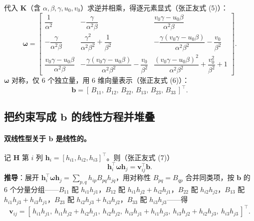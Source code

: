 代入 $\mathbf{K}$（含 $\alpha,\beta,\gamma,u_0,v_0$）求逆并相乘，得逐元素显式（张正友式 (5)\cite{zhang2000calibration}）：
\begin{equation}
  \boldsymbol{\omega}=\begin{bmatrix}
  \dfrac{1}{\alpha^2} & -\dfrac{\gamma}{\alpha^2\beta} & \dfrac{v_0\gamma-u_0\beta}{\alpha^2\beta}\\[2.2ex]
  -\dfrac{\gamma}{\alpha^2\beta} & \dfrac{\gamma^2}{\alpha^2\beta^2}+\dfrac{1}{\beta^2} & -\dfrac{\gamma(v_0\gamma-u_0\beta)}{\alpha^2\beta^2}-\dfrac{v_0}{\beta^2}\\[2.2ex]
  \dfrac{v_0\gamma-u_0\beta}{\alpha^2\beta} & -\dfrac{\gamma(v_0\gamma-u_0\beta)}{\alpha^2\beta^2}-\dfrac{v_0}{\beta^2} & \dfrac{(v_0\gamma-u_0\beta)^2}{\alpha^2\beta^2}+\dfrac{v_0^2}{\beta^2}+1
  \end{bmatrix}.
  \label{eq:calib-omega-elements}
\end{equation}
$\boldsymbol{\omega}$ 对称，仅 $6$ 个独立量，用 $6$ 维向量表示（张正友式 (6)\cite{zhang2000calibration}）：
\begin{equation}
  \mathbf{b}=[\,B_{11},\,B_{12},\,B_{22},\,B_{13},\,B_{23},\,B_{33}\,]^\top.
  \label{eq:calib-b}
\end{equation}

\subsection{把约束写成 $\mathbf{b}$ 的线性方程并堆叠}
\label{sec:calib-Vb}

\paragraph{双线性型关于 $\mathbf{b}$ 是线性的。}
记 $\mathbf{H}$ 第 $i$ 列 $\mathbf{h}_i=[h_{i1},h_{i2},h_{i3}]^\top$。则（张正友式 (7)\cite{zhang2000calibration}）
\begin{equation}
  \mathbf{h}_i^\top\boldsymbol{\omega}\mathbf{h}_j=\mathbf{v}_{ij}^\top\mathbf{b}.
  \label{eq:calib-vij-bilinear}
\end{equation}
\textbf{推导}：展开 $\mathbf{h}_i^\top\boldsymbol{\omega}\mathbf{h}_j=\sum_{p,q}h_{ip}B_{pq}h_{jq}$，用对称性 $B_{pq}=B_{qp}$ 合并同类项，按 $\mathbf{b}$ 的 $6$ 个分量分组——$B_{11}$ 配 $h_{i1}h_{j1}$，$B_{12}$ 配 $h_{i1}h_{j2}+h_{i2}h_{j1}$，$B_{22}$ 配 $h_{i2}h_{j2}$，$B_{13}$ 配 $h_{i1}h_{j3}+h_{i3}h_{j1}$，$B_{23}$ 配 $h_{i2}h_{j3}+h_{i3}h_{j2}$，$B_{33}$ 配 $h_{i3}h_{j3}$——得
\begin{equation}
  \mathbf{v}_{ij}=[\,h_{i1}h_{j1},\ h_{i1}h_{j2}+h_{i2}h_{j1},\ h_{i2}h_{j2},\ h_{i3}h_{j1}+h_{i1}h_{j3},\ h_{i3}h_{j2}+h_{i2}h_{j3},\ h_{i3}h_{j3}\,]^\top.
  \label{eq:calib-vij}
\end{equation}

